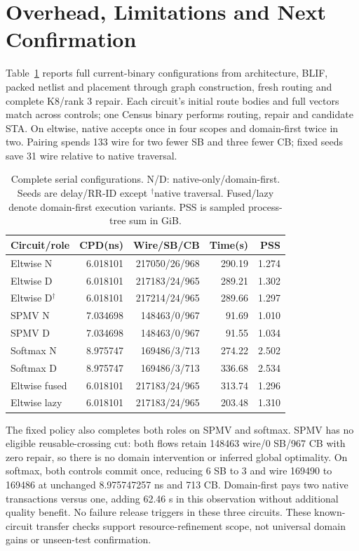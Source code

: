 \documentclass[conference,10pt]{IEEEtran}
\begin{document}
\section{Overhead, Limitations and Next Confirmation}
Table~\ref{tab:completecost} reports full current-binary configurations from architecture, BLIF, packed netlist and placement through graph construction, fresh routing and complete K8/rank 3 repair. Each circuit's initial route bodies and full vectors match across controls; one Census binary performs routing, repair and candidate STA. On eltwise, native accepts once in four scopes and domain-first twice in two. Pairing spends 133 wire for two fewer SB and three fewer CB; fixed seeds save 31 wire relative to native traversal.
\begin{table}[t]
\centering\footnotesize\setlength{\tabcolsep}{3pt}
\caption{Complete serial configurations. N/D: native-only/domain-first. Seeds are delay/RR-ID except $^\dagger$native traversal. Fused/lazy denote domain-first execution variants. PSS is sampled process-tree sum in GiB.}
\label{tab:completecost}
\begin{tabular}{lrrrr}\hline
Circuit/role & CPD(ns) & Wire/SB/CB & Time(s) & PSS\\\hline
Eltwise N&6.018101&217050/26/968&290.19&1.274\\
Eltwise D&6.018101&217183/24/965&289.21&1.302\\
Eltwise D$^\dagger$&6.018101&217214/24/965&289.66&1.297\\
SPMV N&7.034698&148463/0/967&91.69&1.010\\
SPMV D&7.034698&148463/0/967&91.55&1.034\\
Softmax N&8.975747&169486/3/713&274.22&2.502\\
Softmax D&8.975747&169486/3/713&336.68&2.534\\
Eltwise fused&6.018101&217183/24/965&313.74&1.296\\
Eltwise lazy&6.018101&217183/24/965&203.48&1.310\\\hline
\end{tabular}
\end{table}

The fixed policy also completes both roles on SPMV and softmax. SPMV has no eligible reusable-crossing cut: both flows retain 148463 wire/0 SB/967 CB with zero repair, so there is no domain intervention or inferred global optimality. On softmax, both controls commit once, reducing 6 SB to 3 and wire 169490 to 169486 at unchanged 8.975747257 ns and 713 CB. Domain-first pays two native transactions versus one, adding 62.46 s in this observation without additional quality benefit. No failure release triggers in these three circuits. These known-circuit transfer checks support resource-refinement scope, not universal domain gains or unseen-test confirmation.
\end{document}

